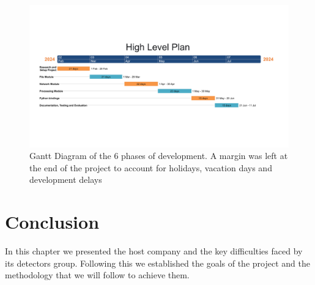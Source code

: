 \begin{spacing}{1.2}
    \begin{figure}[h]\centering
        \includegraphics[width=\textwidth]{Chapitre1/figures/gantt.png}
        \caption{Gantt Diagram of the 6 phases of development. A margin was left at the end of the project to account for
            holidays, vacation days and development delays}
        \label{fig:gantt}
    \end{figure}

    \section*{Conclusion}
    In this chapter we presented the host company and the key difficulties faced
    by its detectors group. Following this we established the goals of the project
    and the methodology that we will follow to achieve them.


\end{spacing}
